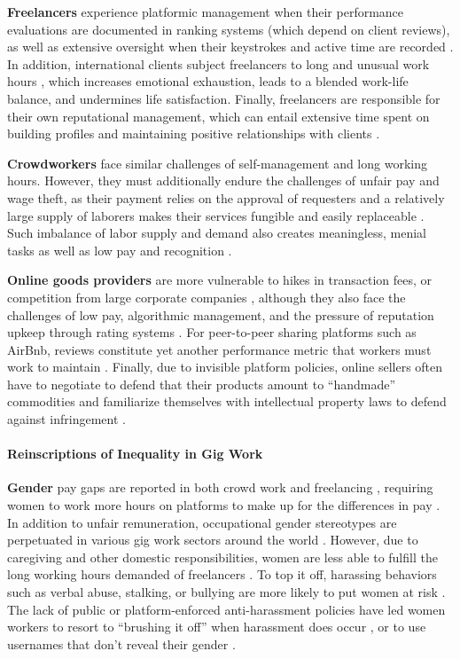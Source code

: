 \textbf{Freelancers} experience platformic management when their performance evaluations are documented in ranking systems (which depend on client reviews), as well as extensive oversight when their keystrokes and active time are recorded \cite{alvarez2022design}. In addition, international clients subject freelancers to long and unusual work hours \cite{Shevchuk2021-qh,Shevchuk_Strebkov_Davis_2019}, which increases emotional exhaustion, leads to a blended work-life balance, and undermines life satisfaction. Finally, freelancers are responsible for their own reputational management, which can entail extensive time spent on building profiles and maintaining positive relationships with clients \cite{freelancecontrol,personal}.

\textbf{Crowdworkers} face similar challenges of self-management and long working hours. However, they must additionally endure the challenges of unfair pay \cite{Barbosa2019-kp} and wage theft, as their payment relies on the approval of requesters and a relatively large supply of laborers makes their services fungible and easily replaceable \cite{turkopticon}. Such imbalance of labor supply and demand also creates meaningless, menial tasks as well as low pay and recognition \cite{Kittur2013-jd,Durward2020-vh}.

\textbf{Online goods providers} are more vulnerable to hikes in transaction fees, or competition from large corporate companies \cite{West_undated-no}, although they also face the challenges of low pay, algorithmic management, and the pressure of reputation upkeep through rating systems \cite{Benson2020-it}. For peer-to-peer sharing platforms such as AirBnb, reviews constitute yet another performance metric that workers must work to maintain \cite{Lawani2019-ry}. Finally, due to invisible platform policies, online sellers often have to negotiate to defend that their products amount to ``handmade'' commodities and familiarize themselves with intellectual property laws to defend against infringement \cite{Razaq2022-lq}. 

\paragraph{Reinscriptions of Inequality in Gig Work} \text
\newline
\textbf{Gender} pay gaps are reported in both crowd work and freelancing \cite{M7rN,foong2021understanding,8lEL,Litman_undated-kh}, requiring women to work more hours on platforms to make up for the differences in pay \cite{Barzilay2016-yl}. In addition to unfair remuneration, occupational gender stereotypes are perpetuated in various gig work sectors around the world \cite{Galperin2021-eh,good}. However, due to caregiving and other domestic responsibilities, women are less able to fulfill the long working hours demanded of freelancers \cite{Adams-Prassl2017-co}. To top it off, harassing behaviors such as verbal abuse, stalking, or bullying are more likely to put women at risk \cite{Rosenblat2017-bm}. The lack of public or platform-enforced anti-harassment policies have led women workers to resort to ``brushing it off'' when harassment does occur \cite{ma2022brush}, or to use usernames that don't reveal their gender \cite{EdLY}.

